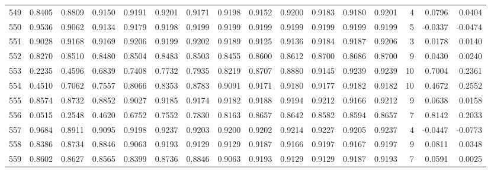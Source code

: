 \begin{tabular}{lrrrrrrrrrrrrrrr}
549 &      0.8405 &  0.8809 &  0.9150 &  0.9191 &  0.9201 &  0.9171 &  0.9198 &  0.9152 &  0.9200 &  0.9183 &   0.9180 &     0.9201 &      4 &                    0.0796 &                     0.0404 \\
550 &      0.9536 &  0.9062 &  0.9134 &  0.9179 &  0.9198 &  0.9199 &  0.9199 &  0.9199 &  0.9199 &  0.9199 &   0.9199 &     0.9199 &      5 &                   -0.0337 &                    -0.0474 \\
551 &      0.9028 &  0.9168 &  0.9169 &  0.9206 &  0.9199 &  0.9202 &  0.9189 &  0.9125 &  0.9136 &  0.9184 &   0.9187 &     0.9206 &      3 &                    0.0178 &                     0.0140 \\
552 &      0.8270 &  0.8510 &  0.8480 &  0.8504 &  0.8483 &  0.8503 &  0.8455 &  0.8600 &  0.8612 &  0.8700 &   0.8686 &     0.8700 &      9 &                    0.0430 &                     0.0240 \\
553 &      0.2235 &  0.4596 &  0.6839 &  0.7408 &  0.7732 &  0.7935 &  0.8219 &  0.8707 &  0.8880 &  0.9145 &   0.9239 &     0.9239 &     10 &                    0.7004 &                     0.2361 \\
554 &      0.4510 &  0.7062 &  0.7557 &  0.8066 &  0.8353 &  0.8783 &  0.9091 &  0.9171 &  0.9180 &  0.9177 &   0.9182 &     0.9182 &     10 &                    0.4672 &                     0.2552 \\
555 &      0.8574 &  0.8732 &  0.8852 &  0.9027 &  0.9185 &  0.9174 &  0.9182 &  0.9188 &  0.9194 &  0.9212 &   0.9166 &     0.9212 &      9 &                    0.0638 &                     0.0158 \\
556 &      0.0515 &  0.2548 &  0.4620 &  0.6752 &  0.7552 &  0.7830 &  0.8163 &  0.8657 &  0.8642 &  0.8582 &   0.8594 &     0.8657 &      7 &                    0.8142 &                     0.2033 \\
557 &      0.9684 &  0.8911 &  0.9095 &  0.9198 &  0.9237 &  0.9203 &  0.9200 &  0.9202 &  0.9214 &  0.9227 &   0.9205 &     0.9237 &      4 &                   -0.0447 &                    -0.0773 \\
558 &      0.8386 &  0.8734 &  0.8846 &  0.9063 &  0.9193 &  0.9129 &  0.9129 &  0.9187 &  0.9166 &  0.9197 &   0.9167 &     0.9197 &      9 &                    0.0811 &                     0.0348 \\
559 &      0.8602 &  0.8627 &  0.8565 &  0.8399 &  0.8736 &  0.8846 &  0.9063 &  0.9193 &  0.9129 &  0.9129 &   0.9187 &     0.9193 &      7 &                    0.0591 &                     0.0025 \\

\end{tabular}
